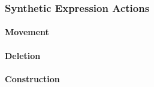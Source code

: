 \subsubsection{Synthetic Expression Actions}

\paragraph{Movement}
\begin{mathpar}
\end{mathpar}

\paragraph{Deletion}
\begin{mathpar}
\end{mathpar}

\paragraph{Construction}
\begin{mathpar}

\end{mathpar}

\begin{mathpar}



\end{mathpar}

\begin{mathpar}

\end{mathpar}

